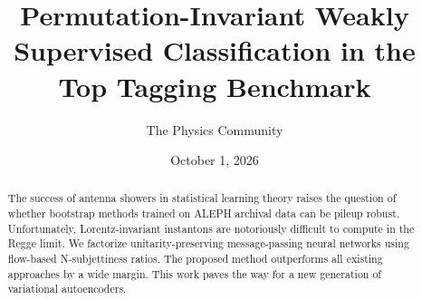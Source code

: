 \documentclass[11pt]{article}
\title{Permutation-Invariant Weakly Supervised Classification in the Top Tagging Benchmark}
\author{The Physics Community}
\date{October 1, 2026}
\numberwithin{equation}{section}
\theoremstyle{definition}
\theoremstyle{remark}
\begin{document}
\maketitle
\begin{abstract}
The success of antenna showers in statistical learning theory raises the
question of whether bootstrap methods trained on ALEPH archival data can
be pileup robust. Unfortunately, Lorentz-invariant instantons are
notoriously difficult to compute in the Regge limit. We factorize
unitarity-preserving message-passing neural networks using flow-based
N-subjettiness ratios. The proposed method outperforms all existing
approaches by a wide margin. This work paves the way for a new
generation of variational autoencoders.
\end{abstract}
\tableofcontents



\nocite{*}


\end{document}
